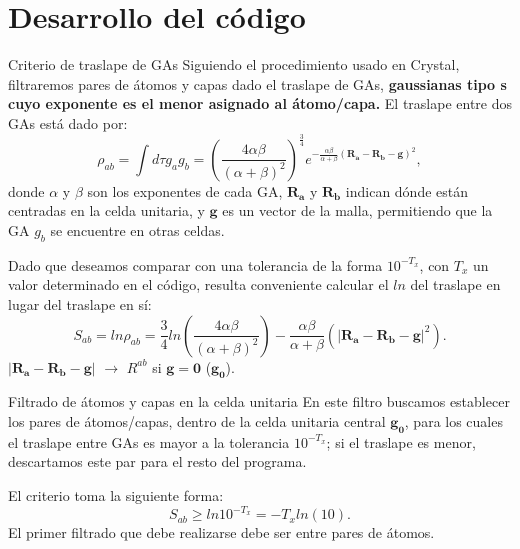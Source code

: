 \documentclass[dvisvgm,11pt,aspectratio=169]{beamer}
\begin{document}
\section{Desarrollo del código}
\begin{frame}{Criterio de traslape de GAs}
	Siguiendo el procedimiento usado en Crystal, filtraremos pares de átomos y capas dado el traslape de GAs, \textbf{gaussianas tipo s cuyo exponente es el menor asignado al átomo/capa.} 
	El traslape entre dos GAs está dado por: 
	\begin{equation}\label{rab}
    \rho_{ab} = \int d\tau g_a g_b = \left( \frac{4\alpha\beta}{(\alpha + \beta)^2} \right)^\frac{3}{4} e^{-\frac{\alpha\beta}{\alpha+\beta}(\mathbf{R_a}-\mathbf{R_b}-\mathbf{g})^2},
\end{equation}
	donde $\alpha$ y $\beta$ son los exponentes de cada GA, $\mathbf{R_a}$ y $\mathbf{R_b}$ indican dónde están centradas en la celda unitaria, y $\mathbf{g}$ es un vector de la malla, permitiendo que la GA $g_b$ se encuentre en otras celdas.
\end{frame}

\begin{frame}
	Dado que deseamos comparar con una tolerancia de la forma $10^{-T_x}$, con $T_x$ un valor determinado en el código, resulta conveniente calcular el $ln$ del traslape en lugar del traslape en sí:
	\begin{equation}\label{Sab}
    S_{ab}=ln \rho_{ab} = \frac{3}{4} ln \left( \frac{4\alpha\beta}{(\alpha + \beta)^2} \right) - \frac{\alpha\beta}{\alpha + \beta} \left( |\mathbf{R_a-R_b-g}|^2 \right).
\end{equation}
	$|\mathbf{R_a-R_b-g}|$ $\rightarrow$ $R^{ab}$ si $\mathbf{g=0}$ ($\mathbf{g_0}$).
\end{frame}

\begin{frame}{Filtrado de átomos y capas en la celda unitaria}
En este filtro buscamos establecer los pares de átomos/capas, dentro de la celda unitaria central $\mathbf{g_0}$, para los cuales el traslape entre GAs es mayor a la tolerancia $10^{-T_x}$; si el traslape es menor, descartamos este par para el resto del programa.

El criterio toma la siguiente forma:
\begin{equation}\label{cond}
    S_{ab} \geq ln 10^{-T_x} = -T_x ln(10).
\end{equation}
El primer filtrado que debe realizarse debe ser entre pares de átomos.
\end{frame}
\end{document}
